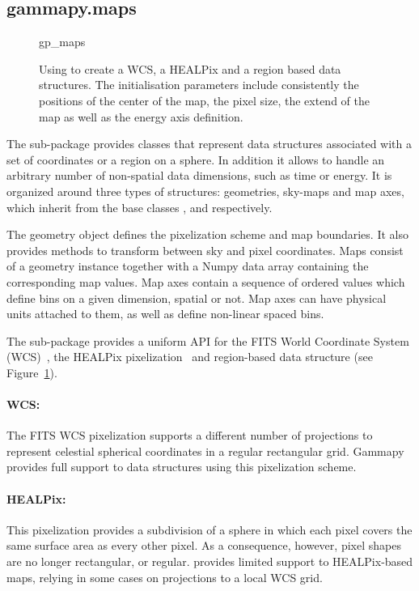\subsection{gammapy.maps}
\label{ssec:gammapy-maps}

\begin{figure}
	{gp_maps}

	\caption{Using  to create a WCS, a HEALPix and a region
		based data structures. The initialisation parameters include
        consistently the positions of the center of the map, the pixel
        size, the extend of the map as well as the energy axis definition.
        } \label{ig*:minted:gp_maps}
\end{figure}

The  sub-package provides classes that represent data
structures associated with a set of coordinates or a region on a sphere. In
addition it allows to handle an arbitrary number of non-spatial data
dimensions, such as time or energy. It is organized around three types of
structures: geometries, sky-maps and map axes, which inherit from the base
classes ,  and  respectively.

The geometry object defines the pixelization scheme and map boundaries. It also
provides methods to transform between sky and pixel coordinates. Maps consist
of a geometry instance together with a Numpy data array containing the corresponding
map values. Map axes contain a sequence of ordered values which define bins on
a given dimension, spatial or not. Map axes can have physical units attached to
them, as well as define non-linear spaced bins.

The sub-package provides a uniform API for the FITS World Coordinate System
(WCS)~\citep{Calabretta2002}, the HEALPix pixelization~\citep{Gorski2005} and
region-based data structure (see Figure~\ref{ig*:minted:gp_maps}).

\paragraph{WCS:}
The FITS WCS pixelization supports a different
number of projections to represent celestial spherical coordinates in a regular
rectangular grid. Gammapy provides full support to data structures using this
pixelization scheme.

\paragraph{HEALPix:}
This pixelization provides a
subdivision of a sphere in which each pixel covers the same surface area as
every other pixel. As a consequence, however, pixel shapes are no longer
rectangular, or regular. \gammapy provides limited support to HEALPix-based
maps, relying in some cases on projections to a local WCS grid.

